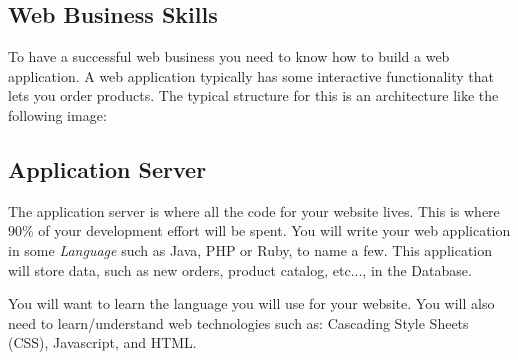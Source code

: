 
\subsection{Web Business Skills}

To have a successful web business you need to know how to build a web application.  A web application typically has some interactive functionality that lets you order products.  The typical structure for this is an architecture like the following image:

\subsection{Application Server}

The application server is where all the code for your website lives.  This is where 90\% of your development effort will be spent.  You will write your web application in some \emph{Language} such as Java, PHP or Ruby, to name a few.  This application will store data, such as new orders, product catalog, etc..., in the Database.



You will want to learn the language you will use for your website.  You will also need to learn/understand web technologies such as: Cascading Style Sheets (CSS), Javascript, and HTML.

